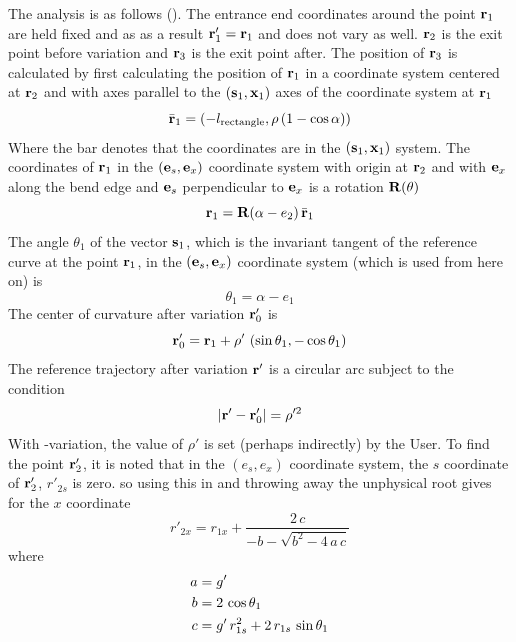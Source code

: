 The  analysis is as follows (). The entrance end coordinates
around the point ${\bf r}_1$ are held fixed and as as a result ${\bf r}'_1 = {\bf r}_1$ and  does not
vary as well. ${\bf r}_2$ is the exit point before variation and ${\bf r}_3$ is the exit point after. The
position of ${\bf r}_3$ is calculated by first calculating the position of ${\bf r}_1$ in a coordinate
system centered at ${\bf r}_2$ and with axes parallel to the $({\bf s}_1, {\bf x}_1)$ axes of the coordinate
system at ${\bf r}_1$
\begin{equation}
  \bar{{\bf r}}_1 = \left( -l_{\text{rectangle}}, \rho \, (1 - \cos\alpha) \right)
\end{equation}
Where the bar denotes that the coordinates are in the $({\bf s}_1, {\bf x}_1)$ system.
The coordinates of ${\bf r}_1$ in the $({\bf e}_s, {\bf e}_x)$ coordinate system
with origin at ${\bf r}_2$ and with ${\bf e}_x$ along the bend edge and ${\bf e}_s$ perpendicular to ${\bf e}_x$
is a rotation ${\bf R}(\theta)$ 
\begin{equation}
  {\bf r}_1 = {\bf R}(\alpha - e_2) \, \bar{{\bf r}}_1
\end{equation}
The angle $\theta_1$ of the vector ${\bf s}_1$, which is the invariant tangent of the reference curve
at the point ${\bf r}_1$, in the $({\bf e}_s, {\bf e}_x)$ coordinate system (which is used from here on) is
\begin{equation}
  \theta_1 = \alpha - e_1
\end{equation}
The center of curvature after variation ${\bf r}'_0$ is 
\begin{equation}
  {\bf r}'_0 = {\bf r}_1 + \rho' \, \left( \sin\theta_1, -\cos\theta_1 \right)
\end{equation}
The reference trajectory after variation ${\bf r}'$ is a circular arc subject to the condition
\begin{equation}
  \left| {\bf r}' - {\bf r}'_0 \right| = \rho'^2
  \label{rr0r}
\end{equation}
With -variation, the value of $\rho'$ is set (perhaps indirectly) by the User. To find the
point ${\bf r}'_2$, it is noted that in the $(e_s, e_x)$ coordinate system,  the $s$
coordinate of ${\bf r}'_2$, $r'_{2s}$ is zero.
so using this in and throwing away the unphysical root gives for the $x$ coordinate
\begin{equation}
  r'_{2x} = r_{1x} + \frac{2 \, c}{-b - \sqrt{b^2-4 \, a \, c}}
\end{equation}
where
\begin{align}
  a &= g' \nonumber \\
  b &= 2 \, \cos\theta_1 \\
  c &= g' \, r_{1s}^2 + 2 \, r_{1s} \, \sin\theta_1 \nonumber
\end{align}
